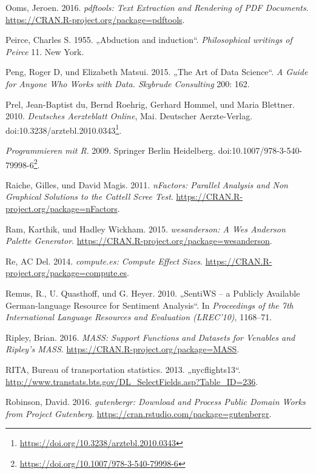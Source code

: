\documentclass[12pt,ngerman,]{book}
\let\rmarkdownfootnote\footnote%
\def\footnote{\protect\rmarkdownfootnote}
\renewcommand{\href}[2]{#2\footnote{\url{#1}}}
\theoremstyle{definition}
\theoremstyle{definition}
\theoremstyle{remark}
\begin{document}
\hypertarget{ref-R-pdftools}{}
Ooms, Jeroen. 2016. \emph{pdftools: Text Extraction and Rendering of PDF
Documents}. \url{https://CRAN.R-project.org/package=pdftools}.

\hypertarget{ref-peirce1955abduction}{}
Peirce, Charles S. 1955. „Abduction and induction``. \emph{Philosophical
writings of Peirce} 11. New York.

\hypertarget{ref-peng2015art}{}
Peng, Roger D, und Elizabeth Matsui. 2015. „The Art of Data Science``.
\emph{A Guide for Anyone Who Works with Data. Skybrude Consulting} 200:
162.

\hypertarget{ref-welchertest}{}
Prel, Jean-Baptist du, Bernd Roehrig, Gerhard Hommel, und Maria
Blettner. 2010. \emph{Deutsches Aerzteblatt Online}, Mai. Deutscher
Aerzte-Verlag.
doi:\href{https://doi.org/10.3238/arztebl.2010.0343}{10.3238/arztebl.2010.0343}.

\hypertarget{ref-ligges}{}
\emph{Programmieren mit R}. 2009. Springer Berlin Heidelberg.
doi:\href{https://doi.org/10.1007/978-3-540-79998-6}{10.1007/978-3-540-79998-6}.

\hypertarget{ref-R-nFactors}{}
Raiche, Gilles, und David Magis. 2011. \emph{nFactors: Parallel Analysis
and Non Graphical Solutions to the Cattell Scree Test}.
\url{https://CRAN.R-project.org/package=nFactors}.

\hypertarget{ref-R-wesanderson}{}
Ram, Karthik, und Hadley Wickham. 2015. \emph{wesanderson: A Wes
Anderson Palette Generator}.
\url{https://CRAN.R-project.org/package=wesanderson}.

\hypertarget{ref-R-compute.es}{}
Re, AC Del. 2014. \emph{compute.es: Compute Effect Sizes}.
\url{https://CRAN.R-project.org/package=compute.es}.

\hypertarget{ref-remquahey2010}{}
Remus, R., U. Quasthoff, und G. Heyer. 2010. „SentiWS -- a Publicly
Available German-language Resource for Sentiment Analysis``. In
\emph{Proceedings of the 7th International Language Resources and
Evaluation (LREC'10)}, 1168--71.

\hypertarget{ref-R-MASS}{}
Ripley, Brian. 2016. \emph{MASS: Support Functions and Datasets for
Venables and Ripley's MASS}.
\url{https://CRAN.R-project.org/package=MASS}.

\hypertarget{ref-nycflights13}{}
RITA, Bureau of transportation statistics. 2013. „nycflights13``.
\url{http://www.transtats.bts.gov/DL_SelectFields.asp?Table_ID=236}.

\hypertarget{ref-R-gutenbergr}{}
Robinson, David. 2016. \emph{gutenbergr: Download and Process Public
Domain Works from Project Gutenberg}.
\url{https://cran.rstudio.com/package=gutenbergr}.
\end{document}
